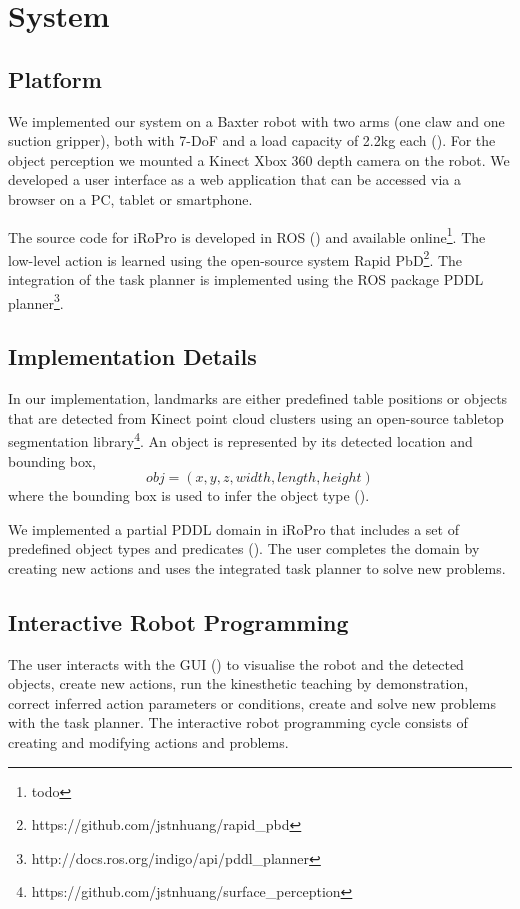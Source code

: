 \section{System}
\label{sec:system}
\subsection{Platform}
\label{sec:platform}
We implemented our system on a Baxter robot with two arms (one claw and one suction gripper), both with 7-DoF and a load capacity of 2.2kg each ().
For the object perception we mounted a Kinect Xbox 360 depth camera on the robot.
We developed a user interface as a web application that can be accessed via a browser on a PC, tablet or smartphone.

The source code for iRoPro is developed in ROS (\cite{quigley2009ros}) and available online\footnote{todo}. %
The low-level action is learned using the open-source system Rapid PbD\footnote{https://github.com/jstnhuang/rapid_pbd}.
The integration of the task planner is implemented using the ROS package PDDL planner\footnote{http://docs.ros.org/indigo/api/pddl_planner}.

\subsection{Implementation Details}
\label{sec:implementation}
In our implementation, landmarks are either predefined table positions or 
objects that are detected from Kinect point cloud clusters using an open-source tabletop segmentation library\footnote{https://github.com/jstnhuang/surface_perception}.
An object is represented by its detected location and bounding box, \ie 
$$obj = (x,y,z, width, length, height)$$ 
where the bounding box is used to infer the object type ().

We implemented a partial PDDL domain in iRoPro that includes a set of predefined object types and predicates ().
The user completes the domain by creating new actions and uses the integrated task planner to solve new problems.


\subsection{Interactive Robot Programming}
\label{sec:interactive}
The user interacts with the GUI () to visualise the robot and the detected objects, create new actions, run the kinesthetic teaching by demonstration, correct inferred action parameters or conditions, create and solve new problems with the task planner.
The interactive robot programming cycle consists of creating and modifying actions and problems.

